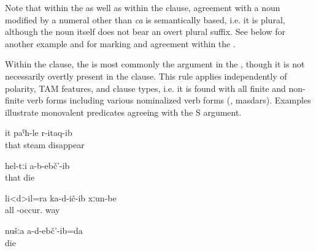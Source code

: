 Note that within the  as well as within the clause,  agreement with a noun modified by a numeral other than \textit{ca}  is semantically based, i.e. it is plural, although the noun itself does not bear an overt plural suffix. See  below for another example and  for  marking and agreement within the .

Within the clause, the  is most commonly the argument in the , though it is not necessarily overtly present in the clause. This rule applies independently of polarity, TAM features, and clause types, i.e. it is found with all finite and non-finite verb forms including various nominalized verb forms (, masdars). Examples  illustrate monovalent predicates agreeing with the S argument. 
%
\begin{exe}

		\ex	\label{ex:She disappeared like steam@11a}
		\gll	it	paˁħ-le	r-itaq-ib\\
			that	steam	disappear\\
		\glt	{}

		\ex	\label{ex:They did not die@11b}
		\gll	hel-tːi	a-b-ebč'-ib\\
			that	die\\
		\glt	{}

		\ex	\label{ex:All roads broke@11c}
		\gll	li<d>il=ra	ka-d-ič-ib	xːun-be\\
			all	-occur.	way\\
		\glt	{}

		\ex	\label{ex:We did not die@11d}
		\gll	nušːa	a-d-ebč'-ib=da\\
				die\\
		\glt	{}
\end{exe}

